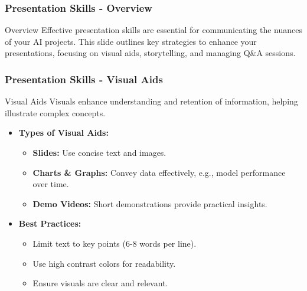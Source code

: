 \documentclass{beamer}
\begin{document}
\begin{frame}[fragile]
    \frametitle{Presentation Skills - Overview}
    \begin{block}{Overview}
        Effective presentation skills are essential for communicating the nuances of your AI projects. This slide outlines key strategies to enhance your presentations, focusing on visual aids, storytelling, and managing Q\&A sessions.
    \end{block}
\end{frame}

\begin{frame}[fragile]
    \frametitle{Presentation Skills - Visual Aids}
    \begin{block}{Visual Aids}
        Visuals enhance understanding and retention of information, helping illustrate complex concepts. 
        \begin{itemize}
            \item \textbf{Types of Visual Aids:}
                \begin{itemize}
                    \item \textbf{Slides:} Use concise text and images.
                    \item \textbf{Charts \& Graphs:} Convey data effectively, e.g., model performance over time.
                    \item \textbf{Demo Videos:} Short demonstrations provide practical insights.
                \end{itemize}
            \item \textbf{Best Practices:}
                \begin{itemize}
                    \item Limit text to key points (6-8 words per line).
                    \item Use high contrast colors for readability.
                    \item Ensure visuals are clear and relevant.
                \end{itemize}
        \end{itemize}
    \end{block}
\end{frame}
\end{document}

